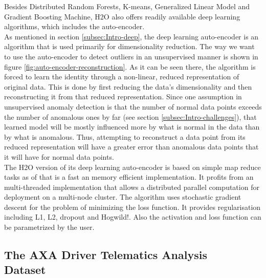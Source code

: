 \documentclass{vldb}
\begin{document}
Besides Distributed Random Forests, K-means, Generalized Linear Model and Gradient Boosting Machine, H2O also offers readily available deep learning algorithms, which includes the auto-encoder. \\
As mentioned in section \ref{subsec:Intro-deep}, the deep learning auto-encoder is an algorithm that is used primarily for dimensionality reduction. The way we want to use the auto-encoder to detect outliers in an unsupervised manner is shown in figure \ref{fig:auto-encoder-reconstruction}. As it can be seen there, the algorithm is forced to learn the identity through a non-linear, reduced representation of original data. This is done by first reducing the data's dimensionality and then reconstructing it from that reduced representation. Since one assumption in unsupervised anomaly detection is that the number of normal data points exceeds the number of anomalous ones by far (see section \ref{subsec:Intro-challenges}), that learned model will be mostly influenced more by what is normal in the data than by what is anomalous. Thus, attempting to reconstruct a data point from its reduced representation will have a greater error than anomalous data points that it will have for normal data points.\\
The H2O version of its deep learning auto-encoder is based on simple map reduce tasks as of that is a fast an memory efficient implementation. It profits from an multi-threaded implementation that allows a distributed parallel computation for deployment on a multi-node cluster. The algorithm uses stochastic gradient descent for the problem of minimizing the loss function. It provides regularisation including L1, L2, dropout and Hogwild!. Also the activation and loss function can be parametrized by the user.


\subsection{The AXA Driver Telematics Analysis \\Dataset}
\label{subsec:Metho-dataset}
\end{document}
